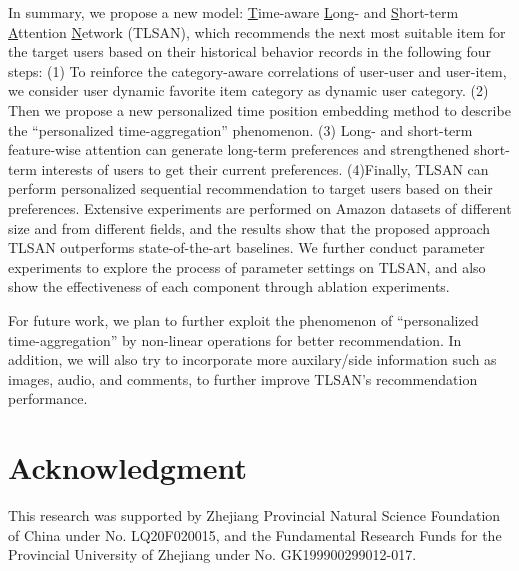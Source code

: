 \documentclass[preprint,12pt]{elsarticle}
\newcommand{\tool}{TLSAN\xspace}
\begin{document}
\begin{sloppypar}
In summary, we propose a new model: \underline{T}ime-aware \underline{L}ong- and \underline{S}hort-term \underline{A}ttention \underline{N}etwork (\tool), which recommends the next most suitable item for the target users based on their historical behavior records in the following four steps: (1) To reinforce the category-aware correlations of user-user and user-item, we consider user dynamic favorite item category as dynamic user category. (2) Then we propose a new personalized time position embedding method to describe the ``personalized time-aggregation'' phenomenon. (3) Long- and short-term feature-wise attention can generate long-term preferences and strengthened short-term interests of users to get their current preferences. (4)Finally, \tool can perform personalized sequential recommendation to target users based on their preferences. Extensive experiments are performed on Amazon datasets of different size and from different fields, and the results show that the proposed approach \tool outperforms state-of-the-art baselines. We further conduct parameter experiments to explore the process of parameter settings on \tool, and also show the effectiveness of each component through ablation experiments.

For future work, we plan to further exploit the phenomenon of ``personalized time-aggregation'' by non-linear operations for better recommendation. In addition, we will also try to incorporate more auxilary/side information such as images, audio, and comments, to further improve \tool's recommendation performance.

\section*{Acknowledgment}
This research was supported by Zhejiang Provincial Natural Science Foundation of China under No. LQ20F020015, and the Fundamental Research Funds for the Provincial University of Zhejiang under No. GK199900299012-017.





 




\end{sloppypar}
\end{document}
